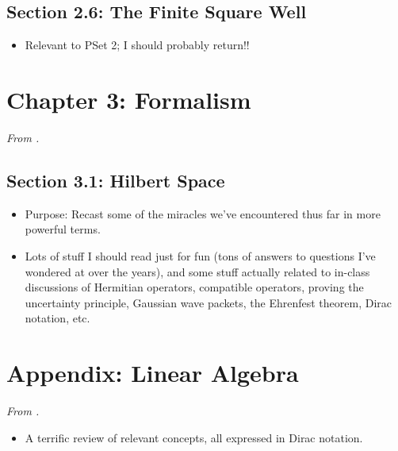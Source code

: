 \documentclass[../notes.tex]{subfiles}
\begin{document}
\subsection*{Section 2.6: The Finite Square Well}
\begin{itemize}
    \item Relevant to PSet 2; I should probably return!!
\end{itemize}



\section{Chapter 3: Formalism}
\emph{From \textcite{bib:Griffiths}.}
\subsection*{Section 3.1: Hilbert Space}
\begin{itemize}
    \item Purpose: Recast some of the miracles we've encountered thus far in more powerful terms.
    \item Lots of stuff I should read just for fun (tons of answers to questions I've wondered at over the years), and some stuff actually related to in-class discussions of Hermitian operators, compatible operators, proving the uncertainty principle, Gaussian wave packets, the Ehrenfest theorem, Dirac notation, etc.
\end{itemize}



\section{Appendix: Linear Algebra}
\emph{From \textcite{bib:Griffiths}.}
\begin{itemize}
    \item A terrific review of relevant concepts, all expressed in Dirac notation.
\end{itemize}
\end{document}
